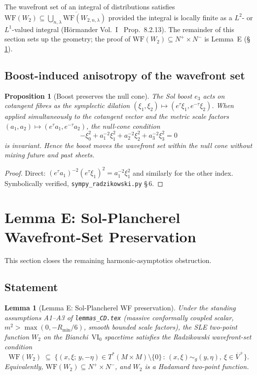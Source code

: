 \documentclass[11pt,a4paper]{article}
\newtheorem{proposition}[theorem]{Proposition}
\newtheorem{lemma}[theorem]{Lemma}
\theoremstyle{definition}
\newcommand{\Lp}{L^2}
\newcommand{\WF}{\mathrm{WF}}
\begin{document}
The wavefront set of an integral of distributions satisfies
$\WF(W_2)\subseteq\overline{\bigcup_{n,\lambda}\WF(W_{2,n,\lambda})}$ provided
the integral is locally finite as a $\Lp$- or $L^1$-valued integral
(H\"ormander Vol.~I~\cite{Hor83} Prop.~8.2.13).
The remainder of this section sets up the geometry; the proof of
$\WF(W_2)\subseteq N^+\times N^-$ is Lemma~E (\S\,\ref{sec:WF}).

\subsection{Boost-induced anisotropy of the wavefront set}

\begin{proposition}[Boost preserves the null cone]\label{prop:WFboost}
The Sol boost $e_3$ acts on cotangent fibres as the symplectic dilation
$(\xi_1,\xi_2)\mapsto (e^\tau \xi_1, e^{-\tau}\xi_2)$.  When applied
\emph{simultaneously} to the cotangent vector and the metric scale factors
$(a_1,a_2)\mapsto(e^\tau a_1, e^{-\tau} a_2)$, the null-cone condition
\[
  -\xi_0^2 + a_1^{-2}\xi_1^2 + a_2^{-2}\xi_2^2 + a_3^{-2}\xi_3^2 = 0
\]
is invariant.  Hence the boost moves the wavefront set within the null cone
without mixing future and past sheets.
\end{proposition}
\begin{proof}
Direct: $(e^\tau a_1)^{-2}(e^\tau\xi_1)^2 = a_1^{-2}\xi_1^2$ and similarly
for the other index.  Symbolically verified, \texttt{sympy\_radzikowski.py}
\S\,6.
\end{proof}

\section{Lemma E: Sol-Plancherel Wavefront-Set Preservation}
\label{sec:WF}

This section closes the remaining harmonic-asymptotics obstruction.

\subsection{Statement}

\begin{lemma}[Lemma E: Sol-Plancherel WF preservation]\label{lem:E}
Under the standing assumptions A1--A3 of \texttt{lemmas\_CD.tex} (massive
conformally coupled scalar, $m^2>\max(0,-R_{\min}/6)$, smooth bounded scale
factors), the SLE two-point function $W_2$ on the Bianchi~$\mathrm{VI_0}$
spacetime satisfies the Radzikowski wavefront-set condition
\begin{equation}\label{eq:lemE}
  \WF(W_2)\;\subseteq\;\bigl\{(x,\xi;\,y,-\eta)\in T^*(M\times M)\setminus\{0\}\,:\,
   (x,\xi)\sim_g (y,\eta),\ \xi\in\overline{V}^{+}\bigr\}.
\end{equation}
Equivalently, $\WF(W_2)\subseteq N^+\times N^-$, and $W_2$ is a Hadamard
two-point function.
\end{lemma}
\end{document}
